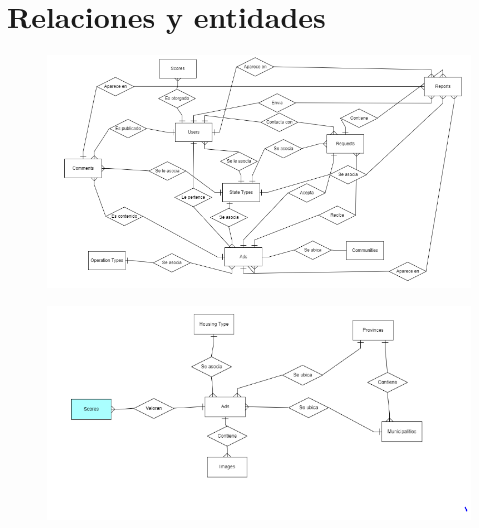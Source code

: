 \section{Relaciones y entidades}
\begin{figure}[h!]
\centering
\includegraphics[width=1\textwidth]{Img/Disenyo/ER/upohouse_er_rel_1.PNG}
\label{fig:dcu}
\end{figure}

\begin{figure}[h!]
\centering
\includegraphics[width=1\textwidth]{Img/Disenyo/ER/upohouse_er_rel_2.PNG}
\label{fig:dcu}
\end{figure}